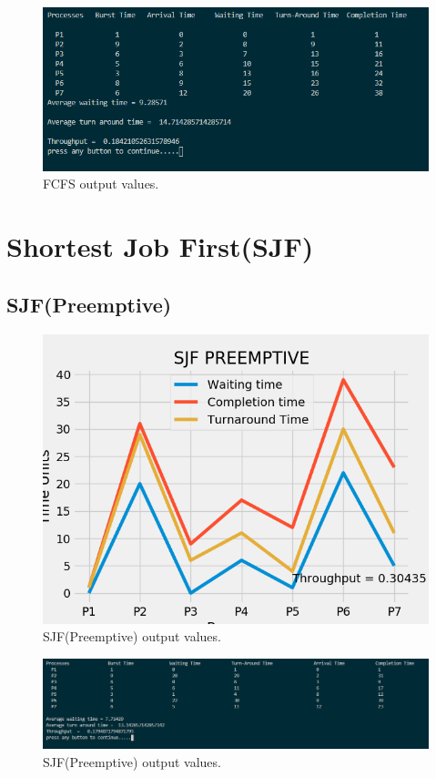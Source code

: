 \documentclass[11pt,a4paper]{report}
\begin{document}
\begin{figure}[H]
	\centering
	\includegraphics[scale=0.8]{./img/fcfs_out.PNG}
	\caption{FCFS output values.}
\end{figure}


\chapter{Shortest Job First(SJF)}
\section{SJF(Preemptive)}

{\begin{figure}[H]
	\centering
	\includegraphics[scale=0.75]{./img/SJF_P_output.png}
	\caption{SJF(Preemptive) output values.}
\end{figure}}

{\begin{figure}[H]
	\centering
	\includegraphics[scale=0.5]{./img/sjf_p_out.PNG}
	\caption{SJF(Preemptive) output values.}
\end{figure}}
\end{document}
